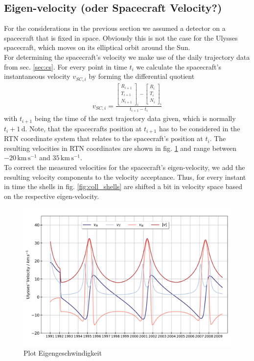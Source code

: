 \subsection{Eigen-velocity (oder Spacecraft Velocity?)}
For the considerations in the previous section we assumed a detector on a spacecraft that is fixed in space. Obviously this is not the case for the Ulysses spacecraft,  which moves on its elliptical orbit around the Sun. \\
For determining the spacecraft's velocity we make use of the daily trajectory data from sec. \ref{sec:cs}. For every point in time $t_i$ we calculate the spacecraft's instantaneous velocity $v_{SC,i}$ by forming the differential quotient 
\begin{align*}
v_{SC,i} = \frac{ \begin{bmatrix}R_{i+1}\\T_{i+1}\\N_{i+1}\end{bmatrix}_i  - \begin{bmatrix}R_{i}\\T_{i}\\N_{i}\end{bmatrix}_i} {t_{i+1} - t_i}
\end{align*}
with $t_{i+1}$ being the time of the next trajectory data given, which is normally $t_i + 1\,\mathrm{d}$. Note, that the spacecrafts position at $t_{i+1}$ has to be considered in the RTN coordinate system that relates to the spacecraft's position at $t_i$. The resulting velocities in RTN coordinates are shown in fig. \ref{fig:eigenv} and range between $-20\,\mathrm{km\,s^{-1}}$ and $35\,\mathrm{km\,s^{-1}}$.
\\
To correct the measured velocities for the spacecraft's eigen-velocity, we add the resulting velocity components to the velocity acceptance. Thus, for every instant in time the shells in fig. \ref{fig:coll_shells} are shifted a bit in velocity space based on the respective eigen-velocity.

\begin{figure}[h]
	\includegraphics[width=1.\textwidth]{Figures/eigenv.pdf}
	\centering
	\caption{Plot Eigengeschwindigkeit}
	\label{fig:eigenv}
\end{figure}




